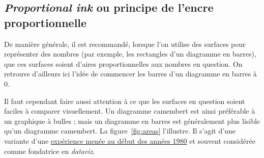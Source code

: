 \subsection{\textit{Proportional ink} ou principe de l'encre proportionnelle}
De manière générale, il est recommandé, lorsque l'on utilise des surfaces pour
représenter des nombres (par exemple, les rectangles d'un diagramme en barres),
que ces surfaces soient d'aires proportionnelles aux nombres en question. On
retrouve d'ailleurs ici l'idée de commencer les barres d'un diagramme en
barres à 0.

Il faut cependant faire aussi attention à ce que les surfaces en question
soient faciles à comparer visuellement. Un diagramme camembert est ainsi
préférable à un graphique à bulles ; mais un diagramme en barres est
généralement plus lisible qu'un diagramme camembert. La figure~\ref{fig:areas}
l'illustre. Il s'agit d'une variante d'une
\href{https://www.jstor.org/stable/2288400}{expérience
  menée au début des années 1980} et souvent considérée comme fondatrice en
\textit{dataviz}.

